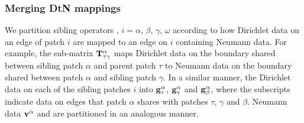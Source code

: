 \subsubsection{Merging DtN mappings} We partition sibling operators \Ti, $i=\alpha$, $\beta$, $\gamma$, $\omega$ according to how Dirichlet data on an edge of patch $i$ are mapped to an edge on $i$ containing Neumann data.  For example, the sub-matrix $\mathbf T^{\alpha}_{\tau\gamma}$ maps Dirichlet data on the boundary shared between sibling patch $\alpha$  and parent patch $\tau$ to Neumann data on the boundary shared between patch $\alpha$ and sibling patch $\gamma$. In a similar manner, the Dirichlet data on each of the sibling patches $i$ into $\mathbf g^{\alpha}_{\tau}$, $\mathbf g^{\alpha}_{\gamma}$ and $\mathbf g^{\alpha}_{\beta}$, where the subscripts indicate data on edges that patch $\alpha$ shares with patches $\tau$, $\gamma$ and $\beta$. Neumann data $\mathbf v^{\alpha}$ and \halpha are partitioned in an analogous manner. 

